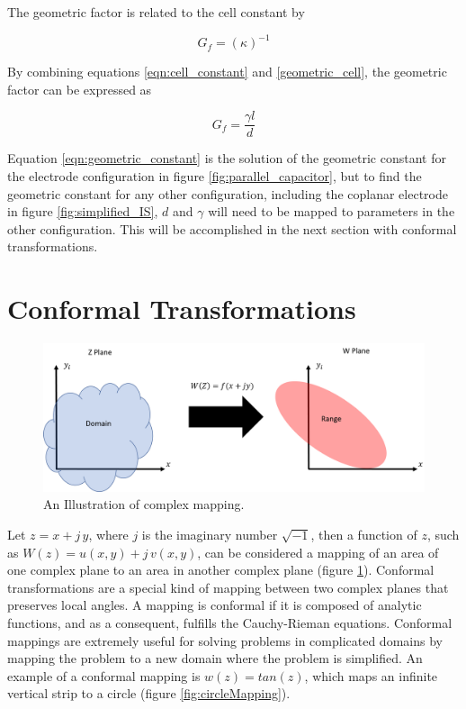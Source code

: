   \noindent The geometric factor is related to the cell constant by 
  
  \begin{equation}
       G_f = (\kappa)^{-1}
       \label{geometric_cell}
  \end{equation}

  \noindent By combining equations \ref{eqn:cell_constant} and \ref{geometric_cell}, the geometric factor can be expressed as
  
  \begin{equation}
      G_f = \frac{\gamma l}{d}
      \label{eqn:geometric_constant}
  \end{equation}
  
  \par Equation \ref{eqn:geometric_constant} is the solution of the geometric constant for the electrode configuration in figure \ref{fig:parallel_capacitor}, but to find the geometric constant for any other configuration, including the coplanar electrode in figure \ref{fig:simplified_IS}, $d$ and $\gamma$ will need to be mapped to parameters in the other configuration. This will be accomplished in the next section with conformal transformations.
  
  
  \section{Conformal Transformations}
  \label{app:conformal_mapping}
  
  \begin{figure}[h]
  \centering
  \includegraphics[width=\textwidth]{images/mapping.png}
  \caption[Illustration of complex mapping.]{An Illustration of complex mapping.}
  \label{fig:mapping}
  \end{figure}
  
  \par Let $z = x + j\,y$, where $j$ is the imaginary number $\sqrt{-1}$, then a function of $z$, such as $W(z) = u(x,y) + j\,v(x,y)$, can be considered a mapping of an area of one complex plane to an area in another complex plane (figure \ref{fig:mapping}). Conformal transformations are a special kind of mapping between two complex planes that preserves local angles. A mapping is conformal if it is composed of analytic functions, and as a consequent, fulfills the Cauchy-Rieman equations. Conformal mappings are extremely useful for solving problems in complicated domains by mapping the problem to a new domain where the problem is simplified. An example of a conformal mapping is $w(z) = tan(z)$, which maps an infinite vertical strip to a circle (figure \ref{fig:circleMapping}). 

